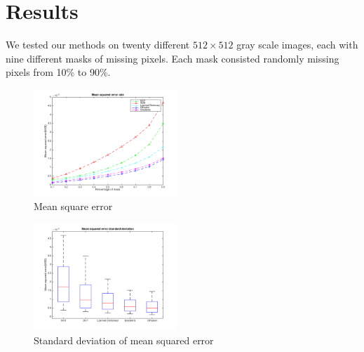 \section{Results}
\label{sec:results}

We tested our methods on twenty different $512\times 512$ gray scale images, each with nine different masks of missing pixels. Each mask consisted randomly missing pixels from 10\% to 90\%.

\begin{figure}
	\centering
		\centering
		\includegraphics[width=0.48\textwidth]{figures/mse}
		\caption{Mean square error }
		\label{fig:mse}
\end{figure}


\begin{figure}
		\centering
		\includegraphics[width=0.48\textwidth]{figures/mse_std}
		\caption{Standard deviation of mean squared error}
		\label{fig:mse_std}	
\end{figure}